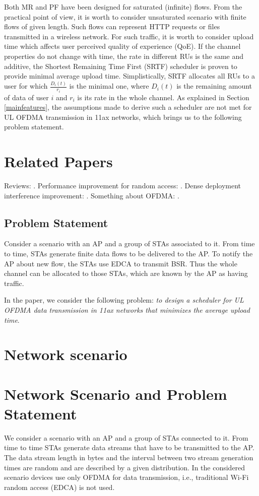 Both MR and PF have been designed for saturated (infinite) flows.
From the practical point of view, it is worth to consider unsaturated scenario with finite flows of given length.
Such flows can represent HTTP requests or files transmitted in a wireless network.
For such traffic, it is worth to consider upload time which affects user perceived quality of experience (QoE).
If the channel properties do not change with time, the rate in different RUs is the same and additive, the Shortest Remaining Time First (SRTF) scheduler is proven to provide minimal average upload time.
Simplistically, SRTF allocates all RUs to a user for which $\frac{D_i(t)}{r_i}$ is the minimal one, where $D_i(t)$ is the remaining amount of data of user $i$ and $r_i$ is its rate in the whole channel.
As explained in Section \ref{mainfeatures}, the assumptions made to derive such a scheduler are not met for UL OFDMA transmission in 11ax networks, which brings us to the following problem statement.
\section{Related Papers}
Reviews: \cite{khorov2015ieee, bellalta2016ieee}.
Performance improvement for random access: \cite{khorov2016several}.
Dense deployment interference improvement: \cite{khorov2016joint}.
Something about OFDMA: \cite{qu2015ofdma}.

\subsection{Problem Statement}
\label{problem}
Consider a scenario with an AP and a group of STAs associated to it.
From time to time, STAs generate finite data flows to be delivered to the AP. To notify the AP about new flow, the STAs use EDCA to transmit BSR. Thus the whole channel can be allocated to those STAs, which are known by the AP as having traffic. 

In the paper, we consider the following problem: \emph{to design a scheduler for UL OFDMA data transmission in 11ax networks that minimizes the average upload time}.

\section{Network scenario}

\section{Network Scenario and Problem Statement}
We consider a scenario with an AP and a group of STAs connected to it.
From time to time STAs generate data streams that have to be transmitted to the AP.
The data stream length in bytes and the interval between two stream generation times are random and are described by a given distribution.
In the considered scenario devices use only OFDMA for data transmission, i.e., traditional Wi-Fi random access (EDCA) is not used.

